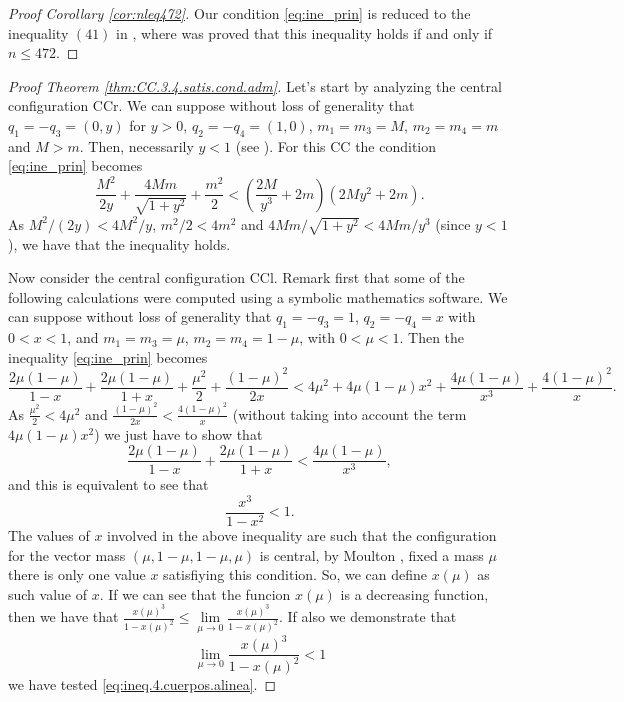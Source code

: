 \documentclass[twoside]{article}
\theoremstyle{remark}
\begin{document}
\begin{proof}[Proof Corollary \ref{cor:nleq472}]
Our condition \eqref{eq:ine_prin} is reduced to the inequality $(41)$ in \cite{li2013characterization}, where was proved that this inequality holds if and only if $n\leq 472$.
\end{proof}

\begin{proof}[Proof Theorem \ref{thm:CC.3.4.satis.cond.adm}]

Let's start by analyzing the central configuration CCr. We can suppose without loss of generality that $ q_1 = -q_3 = (0, y) $ for $ y> 0 $, $ q_2 = -q_4 = (1,0) $, $ m_1 = m_3 = M $, $ m_2 = m_4 = m $ and $ M> m $. Then, necessarily $ y <1 $ (see \cite{perez2007convex}). For this CC  the condition \eqref{eq:ine_prin} becomes
\[\frac{M^2}{2y}+\frac{4Mm}{\sqrt{1+y^2}}+\frac{m^2}{2}<\left(\frac{2M}{y^3}+2m\right) \left(2My^2+2m\right).\]
As $M^2/(2y)<4M^2/y$, $m^2/2<4m^2$ and $4Mm/\sqrt{1+y^2}<4Mm/y^3$ (since $y<1$), we have that the inequality holds.

 Now consider the central configuration CCl.  Remark first that some of the following calculations were computed using a symbolic mathematics  software.  We can suppose without loss of generality that $q_1=-q_3=1$, $q_2=-q_4=x$ with $0<x<1$, and $m_1=m_3=\mu$, $m_2=m_4=1-\mu$, with $0<\mu<1$.  Then the inequality \eqref{eq:ine_prin} becomes
\[\frac{2\mu(1-\mu)}{1-x} +\frac{2\mu(1-\mu)}{1+x}+\frac{\mu^2}{2}+\frac{(1-\mu)^2}{2x}<4\mu^2+4\mu(1-\mu)x^2+\frac{4\mu(1-\mu)}{x^3}+\frac{4(1-\mu)^2}{x}.\]
As $ \frac{\mu ^ 2}{2} <4 \mu^2$ and $ \frac{(1-\mu)^2}{2x}< \frac{4(1-\mu)^2}{x} $ (without taking into account the term $4\mu(1- \mu)x^2$) we just have to show that
\[\frac{2\mu(1-\mu)}{1-x} +\frac{2\mu(1-\mu)}{1+x}<\frac{4\mu(1-\mu)}{x^3},\]
and this is equivalent to see that
\begin{equation}\label{eq:ineq.4.cuerpos.alinea}
\frac{x^3}{1-x^2}<1.
\end{equation}
The values of $x$ involved in the above inequality are such that the configuration for the vector mass $(\mu,1-\mu,1-\mu,\mu)$ is central, by Moulton \cite{moulton1910straight}, fixed a mass $\mu$ there is only one value $x$ satisfiying this condition. So, we can define $x(\mu)$ as such value of $x$. If we can see that the funcion $x(\mu)$ is a decreasing function, then we have that
$\frac{x(\mu)^3}{1-x(\mu)^2}\leq \lim\limits_{\mu\to 0}\frac{x(\mu)^3}{1-x(\mu)^2}.$
If also we demonstrate that 
\begin{equation}\label{eq:ineq.4.cuerpos.lim0}
\lim\limits_{\mu\to 0}\frac{x(\mu)^3}{1-x(\mu)^2}<1
\end{equation} 
we have tested \eqref {eq:ineq.4.cuerpos.alinea}. 


\end{proof}
\end{document}
